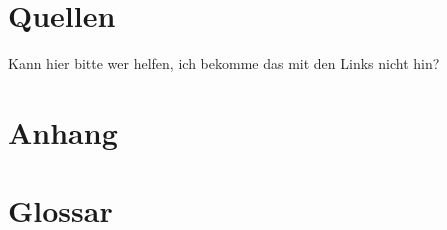 \documentclass[12pt,a4paper]{article}
\begin{document}
\section*{Quellen}
Kann hier bitte wer helfen, ich bekomme das mit den Links nicht hin?
\newpage
\section*{Anhang}
\newpage
\section*{Glossar}
\end{document}
